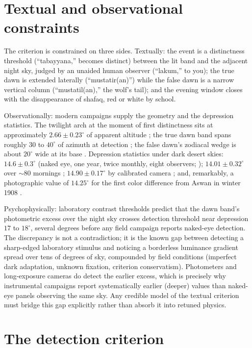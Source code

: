 \documentclass[preprint,12pt]{elsarticle}
\begin{document}
\section{Textual and observational constraints}
\label{sec:sources}

The criterion is constrained on three sides. Textually: the event is a
distinctness threshold (``tabayyana,'' becomes distinct) between the lit
band and the adjacent night sky, judged by an unaided human observer
(``lakum,'' to you); the true dawn is extended laterally
(``mustatir(an)'') while the false dawn is a narrow vertical column
(``mustatil(an),'' the wolf's tail); and the evening window closes with
the disappearance of shafaq, red or white by school.

Observationally: modern campaigns supply the geometry and the depression
statistics. The twilight arch at the moment of first distinctness sits
at approximately $2.66 \pm 0.23^\circ$ of apparent altitude
\citep{mawad2024}; the true dawn band spans roughly 30 to $40^\circ$ of
azimuth at detection \citep{ilyas1984,khalifa2018}; the false dawn's
zodiacal wedge is about $20^\circ$ wide at its base \citep{sultan2004}.
Depression statistics under dark desert skies: $14.6 \pm 0.3^\circ$
(naked eye, one year, twice monthly, eight observers;
\citealp{almostafa2005}); $14.01 \pm 0.32^\circ$ over $\sim$80 mornings
\citep{khalifa2018}; $14.90 \pm 0.17^\circ$ by calibrated camera
\citep{mawad2024}; and, remarkably, a photographic value of $14.25^\circ$
for the first color difference from Aswan in winter 1908
\citep{miethe1909}.

Psychophysically: laboratory contrast thresholds
\citep{blackwell1946,crumey2014} predict that the dawn band's photometric
excess over the night sky crosses detection threshold near depression
$17$ to $18^\circ$, several degrees before any field campaign reports
naked-eye detection. The discrepancy is not a contradiction; it is the
known gap between detecting a sharp-edged laboratory stimulus and
noticing a borderless luminance gradient spread over tens of degrees of
sky, compounded by field conditions (imperfect dark adaptation, unknown
fixation, criterion conservatism). Photometers and long-exposure cameras
do detect the earlier excess, which is precisely why instrumental
campaigns report systematically earlier (deeper) values than naked-eye
panels observing the same sky. Any credible model of the textual
criterion must bridge this gap explicitly rather than absorb it into
retuned physics.

\section{The detection criterion}
\label{sec:criterion}
\end{document}
